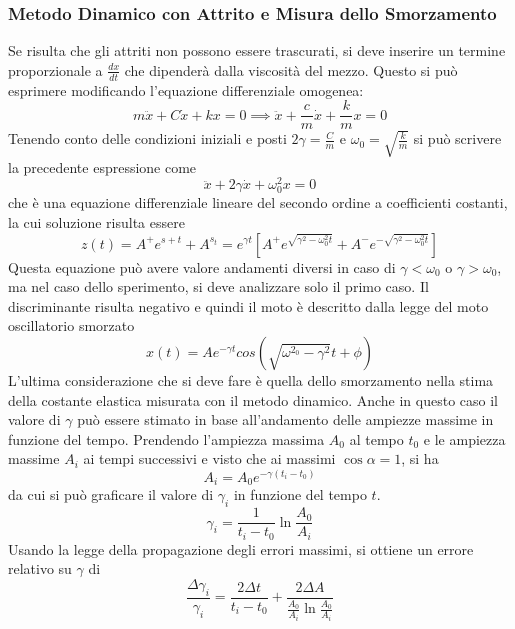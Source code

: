 \documentclass[a4paper]{article}
\begin{document}
\subsubsection{Metodo Dinamico con Attrito e Misura dello Smorzamento}
Se risulta che gli attriti non possono essere trascurati, si deve inserire un termine proporzionale a $\frac{dx}{dt}$ che dipenderà dalla viscosità del mezzo. Questo si può esprimere modificando l'equazione differenziale omogenea:
\begin{equation}
    m\ddot{x}+C\dot{x}+kx=0  \implies \ddot{x}+\frac{c}{m}\dot{x}+\frac{k}{m}x=0
\end{equation}
Tenendo conto delle condizioni iniziali e posti $2\gamma=\frac{C}{m}$ e $\omega_0=\sqrt{\frac{k}{m}}$ si può scrivere la precedente espressione come
\begin{equation}
    \ddot{x}+2\gamma \dot{x}+\omega^2_0 x =0
\end{equation}
che è una equazione differenziale lineare del secondo ordine a coefficienti costanti, la cui soluzione risulta essere 
\begin{equation}
    z(t) = A^+ e^{s+t}+A^{s_t}=e^{\gamma t}[A^+e^{\sqrt{\gamma^2 - \omega^2_0 t}}+A^-e^{-\sqrt{\gamma^2 - \omega^2_0 t}}]
\end{equation}
Questa equazione può avere valore andamenti diversi in caso di $\gamma<\omega_0$ o $\gamma>\omega_0$, ma nel caso dello sperimento, si deve analizzare solo il primo caso. Il discriminante risulta negativo e quindi il moto è descritto dalla legge del moto oscillatorio smorzato
\begin{equation}
    x(t)=Ae^{-\gamma t}cos(\sqrt{\omega^{2_0} - \gamma^2} t + \phi)
\end{equation}
L'ultima considerazione che si deve fare è quella dello smorzamento nella stima della costante elastica misurata con il metodo dinamico. Anche in questo caso il valore di $\gamma$ può essere stimato in base all'andamento delle ampiezze massime in funzione del tempo. Prendendo l'ampiezza massima $A_0$ al tempo $t_0$ e le ampiezza massime $A_i$ ai tempi successivi e visto che ai massimi $\cos \alpha = 1$, si ha
\begin{equation}
    A_i=A_0 e^{-\gamma(t_i-t_0)}
\end{equation}
da cui si può graficare il valore di $\gamma_i$ in funzione del tempo $t$.
\begin{equation} \label{eq23}
    \gamma_i=\frac{1}{t_i-t_0} \ln\frac{A_0}{A_i}
\end{equation}
Usando la legge della propagazione degli errori massimi, si ottiene un errore relativo su $\gamma$ di
\begin{equation}
    \frac{\Delta \gamma_i}{\gamma_i} = \frac{2\Delta t}{t_i - t_0} + \frac{2\Delta A}{\frac{A_0}{A_i} \ln \frac{A_0}{A_i}}
\end{equation}
\end{document}
